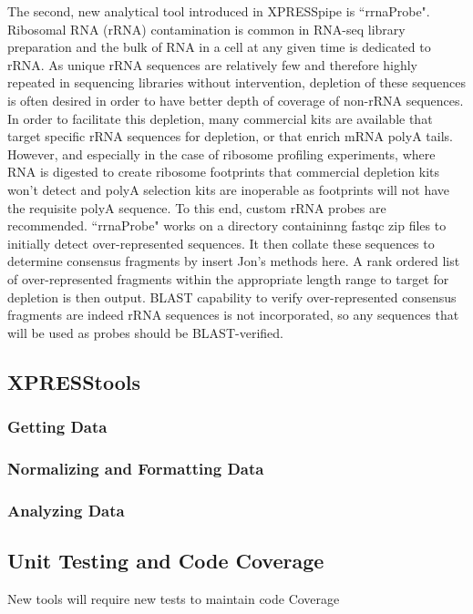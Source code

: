 \documentclass[11pt, a4paper, oneside]{article}
\begin{document}
The second, new analytical tool introduced in XPRESSpipe is ``rrnaProbe". Ribosomal RNA (rRNA) contamination is common in RNA-seq library preparation and the bulk of RNA in a cell at any given time is dedicated to rRNA. As unique rRNA sequences are relatively few and therefore highly repeated in sequencing libraries without intervention, depletion of these sequences is often desired in order to have better depth of coverage of non-rRNA sequences. In order to facilitate this depletion, many commercial kits are available that target specific rRNA sequences for depletion, or that enrich mRNA polyA tails. However, and especially in the case of ribosome profiling experiments, where RNA is digested to create ribosome footprints that commercial depletion kits won't detect and polyA selection kits are inoperable as footprints will not have the requisite polyA sequence. To this end, custom rRNA probes are recommended{}. ``rrnaProbe" works on a directory containinng fastqc{} zip files to initially detect over-represented sequences. It then collate these sequences to determine consensus fragments by {insert Jon's methods here}. A rank ordered list of over-represented fragments within the appropriate length range to target for depletion is then output. BLAST capability to verify over-represented consensus fragments are indeed rRNA sequences is not incorporated, so any sequences that will be used as probes should be BLAST-verified.

\subsection{XPRESStools}

\subsubsection{Getting Data}

\subsubsection{Normalizing and Formatting Data}

\subsubsection{Analyzing Data}

\subsection{Unit Testing and Code Coverage}
New tools will require new tests to maintain code Coverage
\end{document}
